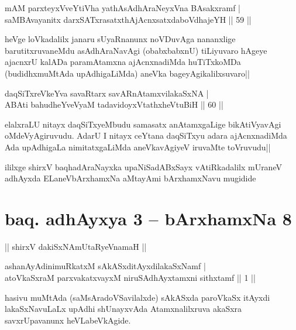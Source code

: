 \begin{shl}
mAM parxteyxVveYtiVha yathA\s sAdhAraNeyxVna BAsakxramf |\\
saMBAvayanitx darxSATxrasatxthA\s jAcnxsatxdaboVdhajeYH \hfill || 59 ||
\end{shl}

\begin{artha}
heVge loVkadalilx janaru sUyaRnanunx noVDuvAga nananxlige barutitxruvaneMdu asAdhAraNavAgi (obabxbabxnU) tiLiyuvaro hAgeye ajacnxrU kalADa paramAtamxna ajAcnxnadiMda huTiTxkoMDa (budidhxmuMtAda upAdhigaLiMda) aneVka bageyAgikalilxsuvaro||
\end{artha}%


\begin{shl}
daqSiTxreVkeYva savaRtarx savARnAtamxvilakaSxNA |\\
ABAti bahudheYveVyaM tadavidoyxVtathxheVtuBiH \hfill || 60 ||
\end{shl}

\begin{artha}
elalxraLU nitayx daqSiTxyeMbudu samasatx anAtamxgaLige bikAtiVyavAgi oMdeVyAgiruvudu. AdarU I nitayx ceYtana daqSiTxyu adara ajAcnxnadiMda Ada upAdhigaLa nimitatxgaLiMda aneVkavAgiyeV iruvaMte toVruvudu||
\end{artha}

\begin{center}
ililxge shirxV baqhadAraNayxka upaNiSadABxSayx vAtiRkadalilx mUraneV adhAyxda ELaneVbArxhamxNa aMtayAmi bArxhamxNavu mugidide
\end{center}

\section*{baq. adhAyxya 3 -- bArxhamxNa 8}

\begin{center}%
|| shirxV dakiSxNAmUtaRyeVnamaH ||
\end{center}

\begin{shl}
ashanAyAdinimuRkatxM sAkASxditAyxdilakaSxNamf |\\
atoV\s kaSxraM parxvakatxvayxM niruSAdhAyxtamxni sithxtamf \hfill || 1 ||
\end{shl}

\begin{artha}
hasivu muMtAda (saMsAradoVSavilalxde) sAkASxda paroVkaSx itAyxdi lakaSxNavuLaLx upAdhi shUnayxvAda Atamxnalilxruva akaSxra savxrUpavanunx heVLabeVkAgide.
\end{artha}

